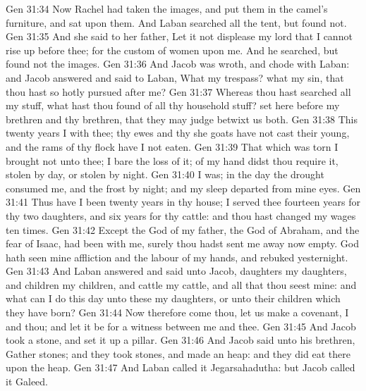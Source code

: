 \vs Gen 31:34 Now Rachel had taken the images, and put them in the camel's furniture, and sat upon them. And Laban searched all the tent, but found  not.
\vs Gen 31:35 And she said to her father, Let it not displease my lord that I cannot rise up before thee; for the custom of women  upon me. And he searched, but found not the images.
\vs Gen 31:36 And Jacob was wroth, and chode with Laban: and Jacob answered and said to Laban, What  my trespass? what  my sin, that thou hast so hotly pursued after me?
\vs Gen 31:37 Whereas thou hast searched all my stuff, what hast thou found of all thy household stuff? set  here before my brethren and thy brethren, that they may judge betwixt us both.
\vs Gen 31:38 This twenty years  I  with thee; thy ewes and thy she goats have not cast their young, and the rams of thy flock have I not eaten.
\vs Gen 31:39 That which was torn  I brought not unto thee; I bare the loss of it; of my hand didst thou require it,  stolen by day, or stolen by night.
\vs Gen 31:40  I was; in the day the drought consumed me, and the frost by night; and my sleep departed from mine eyes.
\vs Gen 31:41 Thus have I been twenty years in thy house; I served thee fourteen years for thy two daughters, and six years for thy cattle: and thou hast changed my wages ten times.
\vs Gen 31:42 Except the God of my father, the God of Abraham, and the fear of Isaac, had been with me, surely thou hadst sent me away now empty. God hath seen mine affliction and the labour of my hands, and rebuked  yesternight.
\vs Gen 31:43 And Laban answered and said unto Jacob,  daughters  my daughters, and  children  my children, and  cattle  my cattle, and all that thou seest  mine: and what can I do this day unto these my daughters, or unto their children which they have born?
\vs Gen 31:44 Now therefore come thou, let us make a covenant, I and thou; and let it be for a witness between me and thee.
\vs Gen 31:45 And Jacob took a stone, and set it up  a pillar.
\vs Gen 31:46 And Jacob said unto his brethren, Gather stones; and they took stones, and made an heap: and they did eat there upon the heap.
\vs Gen 31:47 And Laban called it Jegarsahadutha: but Jacob called it Galeed.
